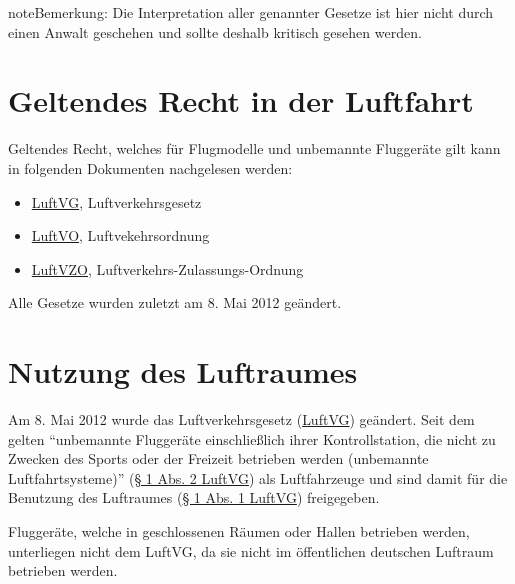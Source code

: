 \documentclass[letterpaper,11pt,ngerman]{andi}
\begin{document}
\begin{notice}{note}{Bemerkung:}
Die Interpretation aller genannter Gesetze ist hier nicht durch einen Anwalt geschehen und sollte deshalb kritisch gesehen werden.
\end{notice}


\section{Geltendes Recht in der Luftfahrt}
\label{included_projects/rechtliches/RECHTLICHES_SPEC/content:geltendes-recht-in-der-luftfahrt}
Geltendes Recht, welches für Flugmodelle und unbemannte Fluggeräte gilt kann in folgenden Dokumenten nachgelesen werden:
\begin{itemize}
\item {} 
\href{http://www.gesetze-im-internet.de/luftvg/index.html}{LuftVG}, Luftverkehrsgesetz

\item {} 
\href{http://www.gesetze-im-internet.de/luftvo/}{LuftVO}, Luftvekehrsordnung

\item {} 
\href{http://www.gesetze-im-internet.de/luftvzo/}{LuftVZO}, Luftverkehrs-Zulassungs-Ordnung

\end{itemize}

Alle Gesetze wurden zuletzt am 8. Mai 2012 geändert.


\section{Nutzung des Luftraumes}
\label{included_projects/rechtliches/RECHTLICHES_SPEC/content:luftvzo}\label{included_projects/rechtliches/RECHTLICHES_SPEC/content:nutzung-des-luftraumes}
Am 8. Mai 2012 wurde das Luftverkehrsgesetz (\href{http://www.gesetze-im-internet.de/luftvg/index.html}{LuftVG}) geändert. Seit dem gelten ``unbemannte Fluggeräte einschließlich ihrer Kontrollstation, die nicht zu Zwecken des Sports oder der Freizeit betrieben werden (unbemannte Luftfahrtsysteme)'' (\href{http://www.gesetze-im-internet.de/luftvg/\_\_2.html}{\S{} 1 Abs. 2 LuftVG}) als Luftfahrzeuge und sind damit für die Benutzung des Luftraumes (\href{http://www.gesetze-im-internet.de/luftvg/\_\_1.html}{\S{} 1 Abs. 1 LuftVG}) freigegeben.

Fluggeräte, welche in geschlossenen Räumen oder Hallen betrieben werden, unterliegen nicht dem LuftVG, da sie nicht im öffentlichen deutschen Luftraum betrieben werden.
\end{document}

